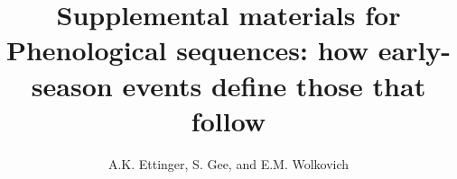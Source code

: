 \documentclass{article}
\begin{document}

\title{Supplemental materials for \\ Phenological sequences: how early-season events define those that follow} 
\author{A.K. Ettinger, S. Gee, and E.M. Wolkovich}
\maketitle  %
\renewcommand{\thetable}{S\arabic{table}}
\renewcommand{\thefigure}{S\arabic{figure}}





%
\end{document}
